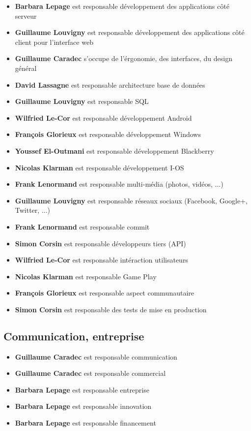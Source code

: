 \documentclass{life-fr}
\begin{document}
\begin{itemize}
  \item \textbf{Barbara Lepage} est responsable développement des applications côté
    serveur
  \item \textbf{Guillaume Louvigny} est responsable développement des
    applications côté client pour l'interface web
  \item \textbf{Guillaume Caradec} s'occupe de l'érgonomie, des interfaces, du
    design général
  \item \textbf{David Lassagne} est responsable architecture base de données
  \item \textbf{Guillaume Louvigny} est responsable SQL
  \item \textbf{Wilfried Le-Cor} est responsable développement Android
  \item \textbf{François Glorieux} est responsable développement Windows
  \item \textbf{Youssef El-Outmani} est responsable développement Blackberry
  \item \textbf{Nicolas Klarman} est responsable développement I-OS
  \item \textbf{Frank Lenormand} est responsable multi-média (photos, vidéos, ...)
  \item \textbf{Guillaume Louvigny} est responsable réseaux sociaux (Facebook,
    Google+, Twitter, ...)
  \item \textbf{Frank Lenormand} est responsable commit
  \item \textbf{Simon Corsin} est responsable développeurs tiers (API)
  \item \textbf{Wilfried Le-Cor} est responsable intéraction utilisateurs
  \item \textbf{Nicolas Klarman} est responsable Game Play
  \item \textbf{François Glorieux} est responsable aspect communautaire
  \item \textbf{Simon Corsin} est responsable des tests de mise en production
\end{itemize}

\subsection{ Communication, entreprise}

\begin{itemize}
  \item \textbf{Guillaume Caradec} est responsable communication
  \item \textbf{Guillaume Caradec} est responsable commercial
  \item \textbf{Barbara Lepage} est responsable entreprise
  \item \textbf{Barbara Lepage} est responsable innovation
  \item \textbf{Barbara Lepage} est responsable financement
\end{itemize}
\end{document}
